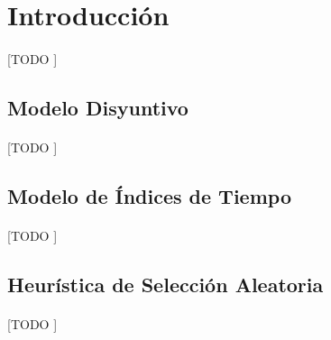 \documentclass[spanish]{article}
\begin{document}
	\maketitle %

	\thispagestyle{fancy} %



	\begin{abstract}
		\noindent [TODO ]
	\end{abstract}


	\section{Introducción}
	\label{sec:intro}

		\paragraph{}
		[TODO ]

		\subsection{Modelo Disyuntivo}
		\label{sec:disyuntive}

			\paragraph{}
			[TODO ]

		\subsection{Modelo de Índices de Tiempo}
		\label{sec:time-index}

			\paragraph{}
			[TODO ]


		\subsection{Heurística de Selección Aleatoria}
		\label{sec:random-heuristic}

			\paragraph{}
			[TODO ]
\end{document}

